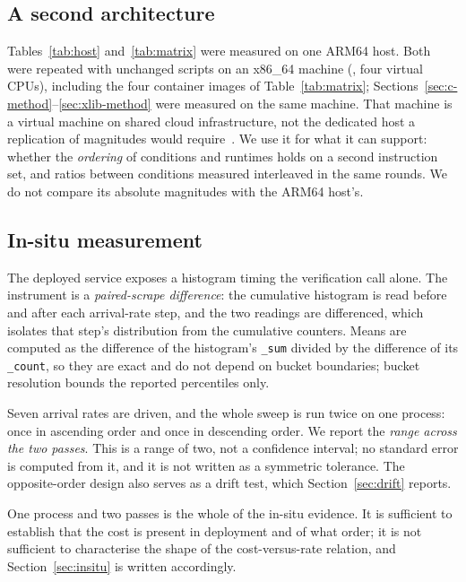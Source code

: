 \documentclass[pdflatex,sn-basic,twocolumn]{sn-jnl}%
\begin{document}
\subsection{A second architecture}\label{sec:arch-method}

Tables~\ref{tab:host} and~\ref{tab:matrix} were measured on one ARM64 host.
Both were repeated with unchanged scripts on an x86\_64 machine (\ExcCpuModel,
four virtual CPUs), including the four container images of
Table~\ref{tab:matrix}; Sections~\ref{sec:c-method}--\ref{sec:xlib-method}
were measured on the same machine. That machine is a virtual machine on shared
cloud infrastructure, not the dedicated host a replication of magnitudes would
require~\citep{laaber2019cloud,leitner2016patterns}. We use it for what it can
support: whether the \emph{ordering} of conditions and runtimes holds on a
second instruction set, and ratios between conditions measured interleaved in
the same rounds. We do not compare its absolute magnitudes with the ARM64
host's.

\subsection{In-situ measurement}\label{sec:insitu-method}

The deployed service exposes a histogram timing the verification call alone. The
instrument is a \emph{paired-scrape difference}: the cumulative histogram is read
before and after each arrival-rate step, and the two readings are differenced,
which isolates that step's distribution from the cumulative counters. Means are
computed as the difference of the histogram's \texttt{\_sum} divided by the
difference of its \texttt{\_count}, so they are exact and do not depend on bucket
boundaries; bucket resolution bounds the reported percentiles only.

Seven arrival rates are driven, and the whole sweep is run twice on one process:
once in ascending order and once in descending order. We report the \emph{range
across the two passes}. This is a range of two, not a confidence interval; no
standard error is computed from it, and it is not written as a symmetric
tolerance. The opposite-order design also serves as a drift test, which
Section~\ref{sec:drift} reports.

One process and two passes is the whole of the in-situ evidence. It is sufficient
to establish that the cost is present in deployment and of what order; it is not
sufficient to characterise the shape of the cost-versus-rate relation, and
Section~\ref{sec:insitu} is written accordingly.
\end{document}
